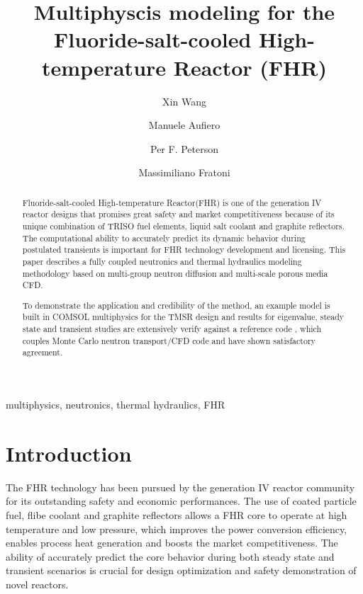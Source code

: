 \documentclass{elsarticle}
\begin{document}
\begin{frontmatter}

\title{Multiphyscis modeling for the Fluoride-salt-cooled High-temperature Reactor (FHR)}
 
\author[ucb]{Xin Wang } 
\author{Manuele Aufiero}
\author{Per F. Peterson}
\author{Massimiliano Fratoni}
\address[ucb]{University of California, Berkeley, Department of Nuclear Engineering, Berkeley, CA 94720-1730 USA}


\begin{abstract}
Fluoride-salt-cooled High-temperature Reactor(FHR) is one of the generation IV reactor designs that promises great safety and market competitiveness because of its unique combination of TRISO fuel elements, liquid salt coolant and graphite reflectors.
 The computational ability to accurately predict its dynamic behavior during postulated transients is important for FHR technology development and licensing. This paper describes a fully coupled neutronics and thermal hydraulics modeling methodology based on multi-group neutron diffusion and multi-scale porous media CFD.
 
 To demonstrate the application and credibility of the method, an example model is built in COMSOL multiphysics for the TMSR design and results for eigenvalue, steady state and transient studies are extensively verify against a reference code , which couples Monte Carlo neutron transport/CFD code and have shown satisfactory agreement.
\end{abstract}

\begin{keyword}
  multiphysics, neutronics, thermal hydraulics, FHR
\end{keyword}

\end{frontmatter}


\section{Introduction}
\label{sec:introduction}
The FHR technology has been pursued by the generation IV reactor community for its outstanding safety and economic performances. The use of coated particle fuel, flibe coolant and graphite reflectors allows a FHR core to operate at high temperature and low pressure, which improves the power conversion efficiency, enables process heat generation and boosts the market competitiveness. 
The ability of accurately predict the core behavior during both steady state and transient scenarios is crucial for design optimization and safety demonstration of novel reactors.
\end{document}
